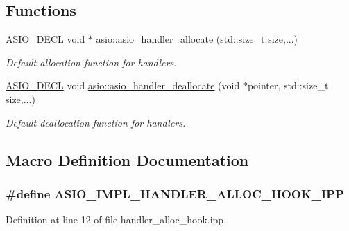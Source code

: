 \subsection*{Functions}
\begin{DoxyCompactItemize}
\item 
\hyperlink{config_8hpp_ab54d01ea04afeb9a8b39cfac467656b7}{A\+S\+I\+O\+\_\+\+D\+E\+C\+L} void $\ast$ \hyperlink{namespaceasio_a825c2034d7e4609cb65e53ec2cf833bf}{asio\+::asio\+\_\+handler\+\_\+allocate} (std\+::size\+\_\+t size,...)
\begin{DoxyCompactList}\small\item\em Default allocation function for handlers. \end{DoxyCompactList}\item 
\hyperlink{config_8hpp_ab54d01ea04afeb9a8b39cfac467656b7}{A\+S\+I\+O\+\_\+\+D\+E\+C\+L} void \hyperlink{namespaceasio_a1316007445a73023bc5603a69c97d9b7}{asio\+::asio\+\_\+handler\+\_\+deallocate} (void $\ast$pointer, std\+::size\+\_\+t size,...)
\begin{DoxyCompactList}\small\item\em Default deallocation function for handlers. \end{DoxyCompactList}\end{DoxyCompactItemize}


\subsection{Macro Definition Documentation}
\hypertarget{handler__alloc__hook_8ipp_a4be3234a83a649e6a315f64e0d25ba3d}{}
\subsubsection[{A\+S\+I\+O\+\_\+\+I\+M\+P\+L\+\_\+\+H\+A\+N\+D\+L\+E\+R\+\_\+\+A\+L\+L\+O\+C\+\_\+\+H\+O\+O\+K\+\_\+\+I\+P\+P}]{\setlength{\rightskip}{0pt plus 5cm}\#define A\+S\+I\+O\+\_\+\+I\+M\+P\+L\+\_\+\+H\+A\+N\+D\+L\+E\+R\+\_\+\+A\+L\+L\+O\+C\+\_\+\+H\+O\+O\+K\+\_\+\+I\+P\+P}\label{handler__alloc__hook_8ipp_a4be3234a83a649e6a315f64e0d25ba3d}


Definition at line 12 of file handler\+\_\+alloc\+\_\+hook.\+ipp.

